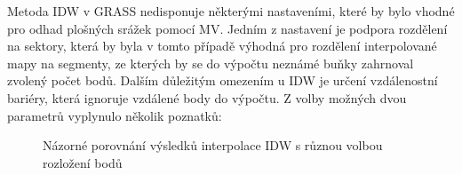 \documentclass[a4paper,12pt,oneside]{report}
\begin{document}
Metoda IDW v GRASS nedisponuje některými nastaveními, které by bylo vhodné
pro odhad plošných srážek pomocí MV. Jedním z nastavení je
podpora rozdělení na sektory, která by byla v tomto případě výhodná
pro rozdělení interpolované mapy na segmenty, ze kterých by se do
výpočtu neznámé buňky zahrnoval zvolený počet bodů. Dalším důležitým
omezením u IDW je určení vzdálenostní bariéry, která ignoruje vzdálené
body do výpočtu. Z volby možných dvou parametrů vyplynulo několik
poznatků:
\begin{figure}[h!]%
    \centering
    \qquad
       \caption[Interpolace IDW]{Názorné porovnání výsledků interpolace IDW s různou volbou rozložení bodů \centering}%

    \label{fig:example}%
\end{figure}
\end{document}
